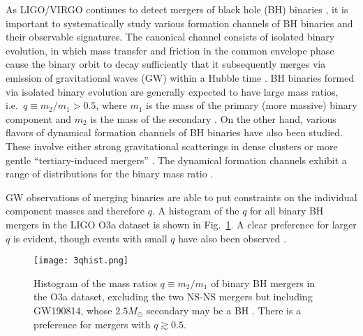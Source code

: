 \documentclass[
        fleqn,
        usenatbib,
    ]{mnras}
\newlength{\colummwidth}
\begin{document}
As LIGO/VIRGO continues to detect mergers of black hole (BH) binaries
\citep[e.g.][]{Abbott:2016blz, abbott2019binary, LIGOO3a}, it is important
to systematically study various formation channels of BH binaries and their
observable signatures. The canonical channel consists of isolated binary
evolution, in which mass transfer and friction in the common envelope phase
cause the binary orbit to decay sufficiently that it subsequently merges via
emission of gravitational waves (GW) within a Hubble time
\citep[e.g.][]{lipunov1997black, lipunov2017first, podsiadlowski2003formation,
belczynski2010effect, belczynski2016first, dominik2012double, dominik2013double,
dominik2015double}. BH binaries formed via isolated binary evolution are
generally expected to have large mass ratios, i.e.\ $q \equiv m_2 / m_1 > 0.5$,
where $m_1$ is the mass of the primary (more massive) binary component and $m_2$
is the mass of the secondary \citep{belczynski2016first, olejak2020}. On
the other hand, various flavors of dynamical formation channels of BH binaries
have also been studied. These involve either strong gravitational scatterings in
dense clusters \citep[e.g.][]{zwart1999black, o2006binary, miller2009mergers,
banerjee2010stellar, downing2010compact, ziosi2014dynamics, rodriguez2015binary,
samsing2017assembly, samsing2018black, rodriguez2018post, gondan2018eccentric}
or more gentle ``tertiary-induced mergers'' \citep[e.g.][]{ bin_misc1,
bin_misc2, bin_misc3, bin_misc4, bin_misc5, blaes2002kozai, miller2002four,
wen2003eccentricity, antonini2012secular, antonini2017binary, silsbee2017lidov,
bin1, bin2, randall2018induced, hoang2018black}. The dynamical formation
channels exhibit a range of distributions for the binary mass ratio
\citep[e.g.][]{silsbee2017lidov, fragione2019}.

GW observations of merging binaries are able to put constraints on the
individual component masses and therefore $q$. A histogram of the $q$ for all
binary BH mergers in the LIGO O3a dataset is shown in Fig.~\ref{fig:qhist}. A
clear preference for larger $q$ is evident, though events with small $q$ have
also been observed \citep[GW190814 and GW190412,][]{LIGOO3a}.

\begin{figure}
    \centering
    \texttt{[image: 3qhist.png]}
    \caption{Histogram of the mass ratios $q \equiv m_2 / m_1$ of binary BH
    mergers in the O3a dataset, excluding the two NS-NS mergers but including
    GW190814, whose $2.5M_{\odot}$ secondary may be a BH \citep{LIGOO3a}. There
    is a preference for mergers with $q \gtrsim 0.5$.
    }\label{fig:qhist}
\end{figure}
\end{document}
